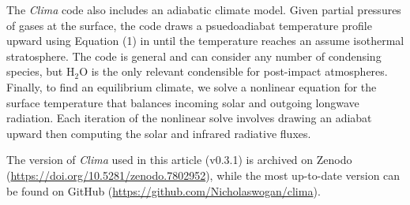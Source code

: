 The \emph{Clima} code also includes an adiabatic climate model. Given partial pressures of gases at the surface, the code draws a psuedoadiabat temperature profile upward using Equation (1) in \citet{Graham_2021} until the temperature reaches an assume isothermal stratosphere. The code is general and can consider any number of condensing species, but H$_2$O is the only relevant condensible for post-impact atmospheres. Finally, to find an equilibrium climate, we solve a nonlinear equation for the surface temperature that balances incoming solar and outgoing longwave radiation. Each iteration of the nonlinear solve involves drawing an adiabat upward then computing the solar and infrared radiative fluxes.

The version of \emph{Clima} used in this article (v0.3.1) is archived on Zenodo (\url{https://doi.org/10.5281/zenodo.7802952}), while the most up-to-date version can be found on GitHub (\url{https://github.com/Nicholaswogan/clima}).

